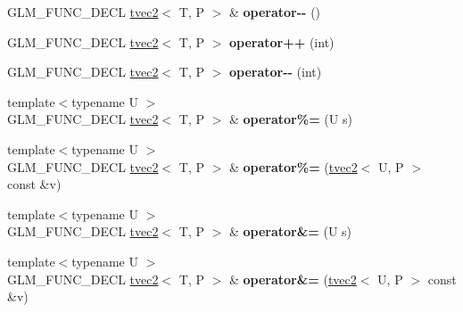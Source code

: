 \begin{DoxyCompactItemize}
\item 
G\+L\+M\+\_\+\+F\+U\+N\+C\+\_\+\+D\+E\+CL \hyperlink{structglm_1_1detail_1_1tvec2}{tvec2}$<$ T, P $>$ \& {\bfseries operator-\/-\/} ()\hypertarget{structglm_1_1detail_1_1tvec2_a0ce16e6435066b8722def0673e5a63e2}{}\label{structglm_1_1detail_1_1tvec2_a0ce16e6435066b8722def0673e5a63e2}

\item 
G\+L\+M\+\_\+\+F\+U\+N\+C\+\_\+\+D\+E\+CL \hyperlink{structglm_1_1detail_1_1tvec2}{tvec2}$<$ T, P $>$ {\bfseries operator++} (int)\hypertarget{structglm_1_1detail_1_1tvec2_aae07e6b50de77040b6fbbda6a179a5e3}{}\label{structglm_1_1detail_1_1tvec2_aae07e6b50de77040b6fbbda6a179a5e3}

\item 
G\+L\+M\+\_\+\+F\+U\+N\+C\+\_\+\+D\+E\+CL \hyperlink{structglm_1_1detail_1_1tvec2}{tvec2}$<$ T, P $>$ {\bfseries operator-\/-\/} (int)\hypertarget{structglm_1_1detail_1_1tvec2_a7335fd9b904d01e325117227054f9d93}{}\label{structglm_1_1detail_1_1tvec2_a7335fd9b904d01e325117227054f9d93}

\item 
{\footnotesize template$<$typename U $>$ }\\G\+L\+M\+\_\+\+F\+U\+N\+C\+\_\+\+D\+E\+CL \hyperlink{structglm_1_1detail_1_1tvec2}{tvec2}$<$ T, P $>$ \& {\bfseries operator\%=} (U s)\hypertarget{structglm_1_1detail_1_1tvec2_a1aafefd65ee6be5c33c981f710ef7949}{}\label{structglm_1_1detail_1_1tvec2_a1aafefd65ee6be5c33c981f710ef7949}

\item 
{\footnotesize template$<$typename U $>$ }\\G\+L\+M\+\_\+\+F\+U\+N\+C\+\_\+\+D\+E\+CL \hyperlink{structglm_1_1detail_1_1tvec2}{tvec2}$<$ T, P $>$ \& {\bfseries operator\%=} (\hyperlink{structglm_1_1detail_1_1tvec2}{tvec2}$<$ U, P $>$ const \&v)\hypertarget{structglm_1_1detail_1_1tvec2_aef1cf765d277bd24d32a999a353e130b}{}\label{structglm_1_1detail_1_1tvec2_aef1cf765d277bd24d32a999a353e130b}

\item 
{\footnotesize template$<$typename U $>$ }\\G\+L\+M\+\_\+\+F\+U\+N\+C\+\_\+\+D\+E\+CL \hyperlink{structglm_1_1detail_1_1tvec2}{tvec2}$<$ T, P $>$ \& {\bfseries operator\&=} (U s)\hypertarget{structglm_1_1detail_1_1tvec2_aac48896750ccf159b9a58b8576ffe536}{}\label{structglm_1_1detail_1_1tvec2_aac48896750ccf159b9a58b8576ffe536}

\item 
{\footnotesize template$<$typename U $>$ }\\G\+L\+M\+\_\+\+F\+U\+N\+C\+\_\+\+D\+E\+CL \hyperlink{structglm_1_1detail_1_1tvec2}{tvec2}$<$ T, P $>$ \& {\bfseries operator\&=} (\hyperlink{structglm_1_1detail_1_1tvec2}{tvec2}$<$ U, P $>$ const \&v)\hypertarget{structglm_1_1detail_1_1tvec2_ab09cab89bbc393f33048cfe08a4bd620}{}\label{structglm_1_1detail_1_1tvec2_ab09cab89bbc393f33048cfe08a4bd620}


\end{DoxyCompactItemize}

